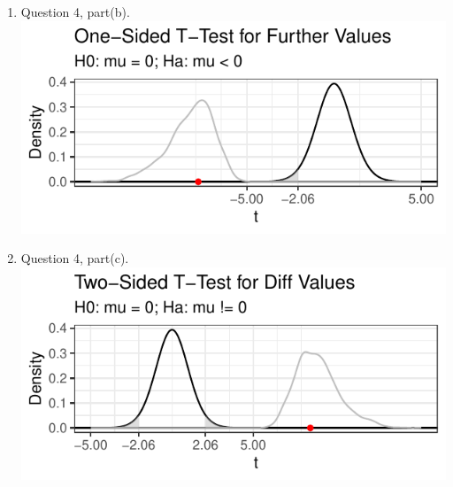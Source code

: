 \documentclass{article}\usepackage[]{graphicx}\usepackage[]{xcolor}
\makeatletter
\def\maxwidth{ %
  \ifdim\Gin@nat@width>\linewidth
    \linewidth
  \else
    \Gin@nat@width
  \fi
}
\newenvironment{knitrout}{}{} %
\makeatother
\begin{document}
\begin{enumerate}
\begin{enumerate}
\begin{knitrout}
\end{knitrout}
  \item Question 4, part(b).
\begin{knitrout}
\color{fgcolor}
\includegraphics[width=\maxwidth]{figure/unnamed-chunk-14-1} 
\end{knitrout}
  \item Question 4, part(c).
\begin{knitrout}
\color{fgcolor}
\includegraphics[width=\maxwidth]{figure/unnamed-chunk-15-1} 
\end{knitrout}
\end{enumerate}
\end{enumerate}



\end{document}

